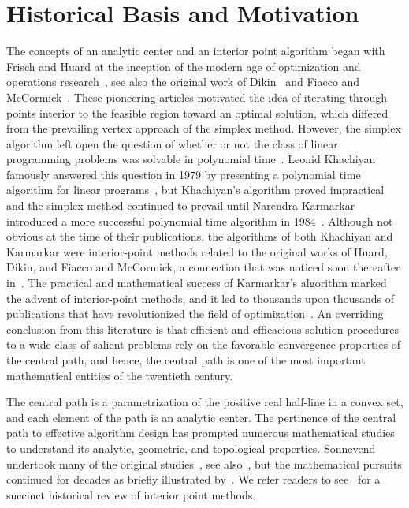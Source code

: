\documentclass{article}
\begin{document}
\section{Historical Basis and Motivation} \label{sec-intro}

The concepts of an analytic center and an interior point
algorithm began with Frisch and Huard at the inception of the 
modern age of optimization and operations research~\cite{frisch1955,huard64,huard67},
see also the original work of Dikin~\cite{dikin67} and
Fiacco and McCormick~\cite{fiacco68}. These pioneering
articles motivated the idea of iterating through points interior 
to the feasible region toward an optimal solution, which differed 
from the prevailing vertex approach of the simplex method. However, the 
simplex algorithm left open the question of whether or not the class of 
linear programming problems was solvable in polynomial time~\cite{klee72}. 
Leonid Khachiyan famously answered this question in 1979 by presenting 
a polynomial time algorithm for linear programs~\cite{khachiyan79}, but
Khachiyan's algorithm proved impractical and the simplex method continued to 
prevail until Narendra Karmarkar introduced a more successful polynomial 
time algorithm in 1984~\cite{karmarkar84b,karmarkar84a}. Although not 
obvious at the time of their publications, the algorithms of both Khachiyan 
and Karmarkar were interior-point methods related to the original works of 
Huard, Dikin, and Fiacco and McCormick, a connection that was noticed soon 
thereafter in~\cite{gill86}. The practical and mathematical success of 
Karmarkar's algorithm marked the advent of interior-point methods, and it
led to thousands upon thousands of publications that have revolutionized the 
field of optimization~\cite{forsgren02,wright98,wright05}. An overriding
conclusion from this literature is that efficient and efficacious 
solution procedures to a wide class of salient problems rely on the 
favorable convergence properties of the central path, and hence,
the central path is one of the most important mathematical entities of the 
twentieth century.

The central path is a parametrization of the positive real half-line in a convex
set, and each element of the path is an analytic center. The pertinence 
of the central path to effective algorithm design has prompted numerous 
mathematical studies to understand its analytic, geometric, and topological 
properties. Sonnevend undertook many of the original 
studies~\cite{sonnevend86,sonnevend88}, see also~\cite{jarre88}, but the 
mathematical pursuits continued for decades as briefly illustrated 
by~\cite{caron02,deza06,halicka99,holder00,deloera12,nematollahi08,vavasis96}.
We refer readers to see~\cite{terlaky2009} for a succinct historical
review of interior point methods.
\end{document}
